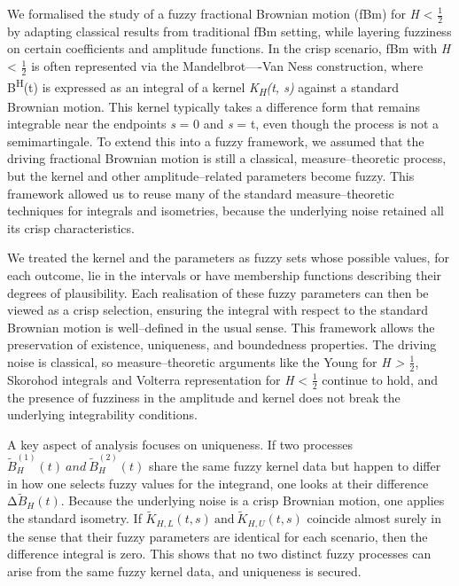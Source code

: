 \documentclass[12pt,a4paper]{report}
\numberwithin{equation}{section}
\begin{document}
We formalised the study of a fuzzy fractional Brownian motion (fBm) for
\emph{H} \textless{} $\frac{1}{2}$ by adapting classical results from traditional
fBm setting, while layering fuzziness on certain coefficients and
amplitude functions. In the crisp scenario, fBm with \emph{H}
\textless{} $\frac{1}{2}$ is often represented via the Mandelbrot----Van Ness
construction, where B\textsuperscript{H}(t) is expressed as an integral
of a kernel \emph{K\textsubscript{H}(t, s)} against a standard Brownian
motion. This kernel typically takes a difference form that remains
integrable near the endpoints \emph{s} = 0 and \emph{s} = t, even though
the process is not a semimartingale. To extend this into a fuzzy
framework, we assumed that the driving fractional Brownian motion is
still a classical, measure--theoretic process, but the kernel and other
amplitude--related parameters become fuzzy. This framework allowed us to
reuse many of the standard measure--theoretic techniques for integrals
and isometries, because the underlying noise retained all its crisp
characteristics.

We treated the kernel and the parameters as fuzzy sets whose possible
values, for each outcome, lie in the intervals or have membership
functions describing their degrees of plausibility. Each realisation of
these fuzzy parameters can then be viewed as a crisp selection, ensuring
the integral with respect to the standard Brownian motion is
well--defined in the usual sense. This framework allows the preservation
of existence, uniqueness, and boundedness properties. The driving noise
is classical, so measure--theoretic arguments like the Young for \emph{H
\textgreater{} $\frac{1}{2}$}, Skorohod integrals and Volterra representation for
\emph{H} \textless{} $\frac{1}{2}$ continue to hold, and the presence of fuzziness
in the amplitude and kernel does not break the underlying integrability
conditions.

A key aspect of analysis focuses on uniqueness. If two processes
\({\widetilde{B}}_{H}^{(1)}(t)\ and\ {\widetilde{B}}_{H}^{(2)}(t)\)
share the same fuzzy kernel data but happen to differ in how one selects
fuzzy values for the integrand, one looks at their difference
\({\mathrm{\Delta}\widetilde{B}}_{H}(t)\). Because the underlying noise
is a crisp Brownian motion, one applies the standard isometry. If
\(\widetilde{K}_{H,L}(t,s)\ \text{and}\ \widetilde{K}_{H,U}(t,s)\)
coincide almost surely in the sense that their fuzzy parameters are
identical for each scenario, then the difference integral is zero. This
shows that no two distinct fuzzy processes can arise from the same fuzzy
kernel data, and uniqueness is secured.
\end{document}
